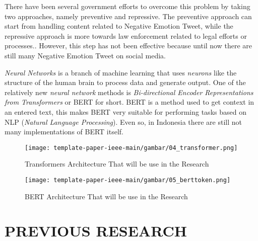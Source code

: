 There have been several government efforts to overcome this problem by taking two approaches, namely preventive and repressive. The preventive approach can start from handling content related to Negative Emotion Tweet, while the repressive approach is more towards law enforcement related to legal efforts or processes.\cite{kominfo}. However, this step has not been effective because until now there are still many Negative Emotion Tweet on social media. 

\textit{Neural Networks} is a branch of machine learning that uses \textit{neurons} like the structure of the human brain to process data and generate output. One of the relatively new \textit{neural network} methods is \textit{Bi-directional Encoder Representations from Transformers} or BERT for short. BERT is a method used to get context in an entered text, this makes BERT very suitable for performing tasks based on NLP (\textit{Natural Language Processing}). Even so, in Indonesia there are still not many implementations of BERT itself.

\begin{figure}[h]
    \begin{center}
        \texttt{[image: template-paper-ieee-main/gambar/04\_transformer.png]}
        \caption{Transformers Architecture That will be use in the Research}
        \label{fig: transformers}
    \end{center}
\end{figure}

\begin{figure}[h]
    \begin{center}
        \texttt{[image: template-paper-ieee-main/gambar/05\_berttoken.png]}
        \caption{BERT Architecture That will be use in the Research}
        \label{fig: bert}
    \end{center}
\end{figure}



\section{PREVIOUS RESEARCH}
\label{sec:penelitianterdahulu}

